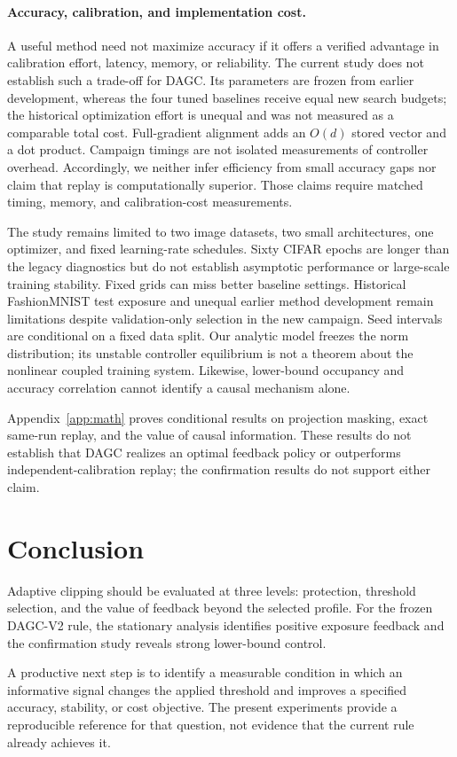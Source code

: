 \documentclass{article}
\begin{document}



\paragraph{Accuracy, calibration, and implementation cost.}
A useful method need not maximize accuracy if it offers a verified advantage
in calibration effort, latency, memory, or reliability. The current study does
not establish such a trade-off for DAGC. Its parameters are frozen from earlier
development, whereas the four tuned baselines receive equal new search
budgets; the historical optimization effort is unequal and was not measured
as a comparable total cost. Full-gradient alignment adds an $O(d)$ stored
vector and a dot product. Campaign timings are not isolated measurements of
controller overhead. Accordingly, we neither infer efficiency from small
accuracy gaps nor claim that replay is computationally superior. Those claims
require matched timing, memory, and calibration-cost measurements.

The study remains limited to two image datasets, two small architectures,
one optimizer, and fixed learning-rate schedules. Sixty CIFAR epochs are
longer than the legacy diagnostics but do not establish asymptotic performance
or large-scale training stability. Fixed grids can miss better baseline
settings. Historical FashionMNIST test exposure and unequal earlier method
development remain limitations despite validation-only selection in the new
campaign. Seed intervals are conditional on a fixed data split. Our analytic
model freezes the norm distribution; its unstable controller equilibrium is
not a theorem about the nonlinear coupled training system. Likewise, lower-bound
occupancy and accuracy correlation cannot identify a causal mechanism alone.

Appendix~\ref{app:math} proves conditional results on projection masking,
exact same-run replay, and the value of causal information. These results do
not establish that DAGC realizes an optimal feedback policy or outperforms
independent-calibration replay; the confirmation results do not support either
claim.

\section{Conclusion}
Adaptive clipping should be evaluated at three levels: protection, threshold
selection, and the value of feedback beyond the selected profile. For the
frozen DAGC-V2 rule, the stationary analysis identifies positive exposure
feedback and the confirmation study reveals strong lower-bound control.

A productive next step is to identify a measurable condition in which an
informative signal changes the applied threshold and improves a specified
accuracy, stability, or cost objective. The present experiments provide a
reproducible reference for that question, not evidence that the current rule
already achieves it.
\end{document}
